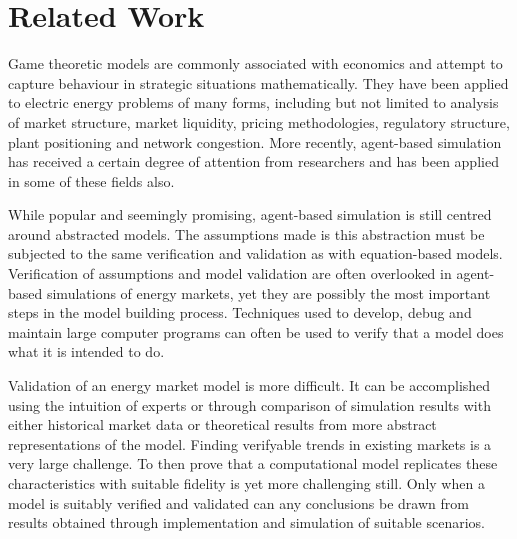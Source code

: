\chapter{Related Work}
\label{ch:related_work}
Game theoretic models are commonly associated with economics and attempt to
capture behaviour in strategic situations mathematically.  They have been
applied to electric energy problems of many forms, including but not limited
to analysis of market structure, market liquidity, pricing methodologies,
regulatory structure, plant positioning and network congestion.  More
recently, agent-based simulation has received a certain degree of attention
from researchers and has been applied in some of these fields also.

While popular and seemingly promising, agent-based simulation is still centred
around abstracted models.  The assumptions made is this abstraction must be
subjected to the same verification and validation as with equation-based
models.  Verification of assumptions and model validation are often overlooked
in agent-based simulations of energy markets, yet they are possibly the most
important steps in the model building process.  Techniques used to develop,
debug and maintain large computer programs can often be used to verify that a
model does what it is intended to do.

Validation of an energy market model is more difficult.  It can be accomplished
using the intuition of experts or through comparison of simulation results
with either historical market data or theoretical results from more abstract
representations of the model.  Finding verifyable trends in existing markets
is a very large challenge.  To then prove that a computational model
replicates these characteristics with suitable fidelity is yet more
challenging still.  Only when a model is suitably verified and validated can
any conclusions be drawn from results obtained through implementation and
simulation of suitable scenarios.